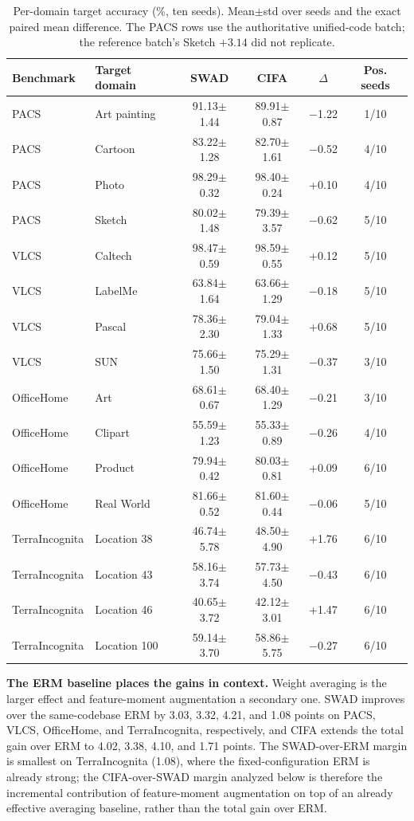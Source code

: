 \documentclass[electronics,article,submit,moreauthors]{Definitions/mdpi}
\begin{document}
\begin{table}[H]
\caption{Per-domain target accuracy (\%, ten seeds). Mean$\pm$std over seeds and the exact paired mean difference. The PACS rows use the authoritative unified-code batch; the reference batch's Sketch $+3.14$ did not replicate.}
\label{tab:perdomain}
\setlength{\tabcolsep}{6pt}
\begin{tabular}{llcccc}
\toprule
\textbf{Benchmark} & \textbf{Target domain} & \textbf{SWAD} & \textbf{CIFA} & $\Delta$ & \textbf{Pos. seeds}\\
\midrule
PACS & Art painting & 91.13$\pm$1.44 & 89.91$\pm$0.87 & $-$1.22 & 1/10\\
PACS & Cartoon & 83.22$\pm$1.28 & 82.70$\pm$1.61 & $-$0.52 & 4/10\\
PACS & Photo & 98.29$\pm$0.32 & 98.40$\pm$0.24 & +0.10 & 4/10\\
PACS & Sketch & 80.02$\pm$1.48 & 79.39$\pm$3.57 & $-$0.62 & 5/10\\
VLCS & Caltech & 98.47$\pm$0.59 & 98.59$\pm$0.55 & +0.12 & 5/10\\
VLCS & LabelMe & 63.84$\pm$1.64 & 63.66$\pm$1.29 & $-$0.18 & 5/10\\
VLCS & Pascal & 78.36$\pm$2.30 & 79.04$\pm$1.33 & +0.68 & 5/10\\
VLCS & SUN & 75.66$\pm$1.50 & 75.29$\pm$1.31 & $-$0.37 & 3/10\\
OfficeHome & Art & 68.61$\pm$0.67 & 68.40$\pm$1.29 & $-$0.21 & 3/10\\
OfficeHome & Clipart & 55.59$\pm$1.23 & 55.33$\pm$0.89 & $-$0.26 & 4/10\\
OfficeHome & Product & 79.94$\pm$0.42 & 80.03$\pm$0.81 & +0.09 & 6/10\\
OfficeHome & Real World & 81.66$\pm$0.52 & 81.60$\pm$0.44 & $-$0.06 & 5/10\\
TerraIncognita & Location 38 & 46.74$\pm$5.78 & 48.50$\pm$4.90 & +1.76 & 6/10\\
TerraIncognita & Location 43 & 58.16$\pm$3.74 & 57.73$\pm$4.50 & $-$0.43 & 6/10\\
TerraIncognita & Location 46 & 40.65$\pm$3.72 & 42.12$\pm$3.01 & +1.47 & 6/10\\
TerraIncognita & Location 100 & 59.14$\pm$3.70 & 58.86$\pm$5.75 & $-$0.27 & 6/10\\
\bottomrule
\end{tabular}
\end{table}

\textbf{The ERM baseline places the gains in context.} Weight averaging is the larger effect and feature-moment augmentation a secondary one. SWAD improves over the same-codebase ERM by 3.03, 3.32, 4.21, and 1.08 points on PACS, VLCS, OfficeHome, and TerraIncognita, respectively, and CIFA extends the total gain over ERM to 4.02, 3.38, 4.10, and 1.71 points. The SWAD-over-ERM margin is smallest on TerraIncognita (1.08), where the fixed-configuration ERM is already strong; the CIFA-over-SWAD margin analyzed below is therefore the incremental contribution of feature-moment augmentation on top of an already effective averaging baseline, rather than the total gain over ERM.
\end{document}
